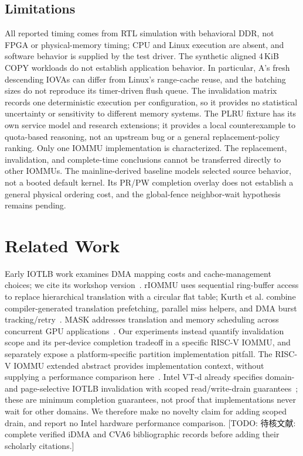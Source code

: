 \documentclass[sigconf,nonacm]{acmart}
\newcommand{\todo}[1]{{\color{brown}\textsf{[TODO: #1]}}}
\newcommand{\claim}[1]{} %
\begin{document}
\subsection{Limitations}
All reported timing comes from RTL simulation with behavioral DDR, not FPGA or physical-memory timing; CPU and Linux execution are absent, and software behavior is supplied by the test driver.\claim{C096}
The synthetic aligned 4\,KiB COPY workloads do not establish application behavior. In particular, A's fresh descending IOVAs can differ from Linux's range-cache reuse, and the batching sizes do not reproduce its timer-driven flush queue.\claim{C097}
The invalidation matrix records one deterministic execution per configuration, so it provides no statistical uncertainty or sensitivity to different memory systems.\claim{C098}
The PLRU fixture has its own service model and research extensions; it provides a local counterexample to quota-based reasoning, not an upstream bug or a general replacement-policy ranking.\claim{C099}
Only one IOMMU implementation is characterized. The replacement, invalidation, and complete-time conclusions cannot be transferred directly to other IOMMUs.\claim{C100}
The mainline-derived baseline models selected source behavior, not a booted default kernel. Its PR/PW completion overlay does not establish a general physical ordering cost, and the global-fence neighbor-wait hypothesis remains pending.\claim{N022}

\section{Related Work}
Early IOTLB work examines DMA mapping costs and cache-management choices; we cite its workshop version~\cite{iotlb_bottleneck2010}.\claim{C101}
rIOMMU uses sequential ring-buffer access to replace hierarchical translation with a circular flat table; Kurth et al. combine compiler-generated translation prefetching, parallel miss helpers, and DMA burst tracking/retry~\cite{riommu2015,socdma2018}.\claim{C102}
MASK addresses translation and memory scheduling across concurrent GPU applications~\cite{mask2018}.\claim{C103}
Our experiments instead quantify invalidation scope and its per-device completion tradeoff in a specific RISC-V IOMMU, and separately expose a platform-specific partition implementation pitfall.\claim{C104}
The RISC-V IOMMU extended abstract provides implementation context, without supplying a performance comparison here~\cite{zero_day_iommu2023}.\claim{C105}
Intel VT-d already specifies domain- and page-selective IOTLB invalidation with scoped read/write-drain guarantees~\cite{intel_vtd2024}; these are minimum completion guarantees, not proof that implementations never wait for other domains.\claim{N025}
We therefore make no novelty claim for adding scoped drain, and report no Intel hardware performance comparison.
\todo{待核文献: complete verified iDMA and CVA6 bibliographic records before adding their scholarly citations.}
\end{document}
